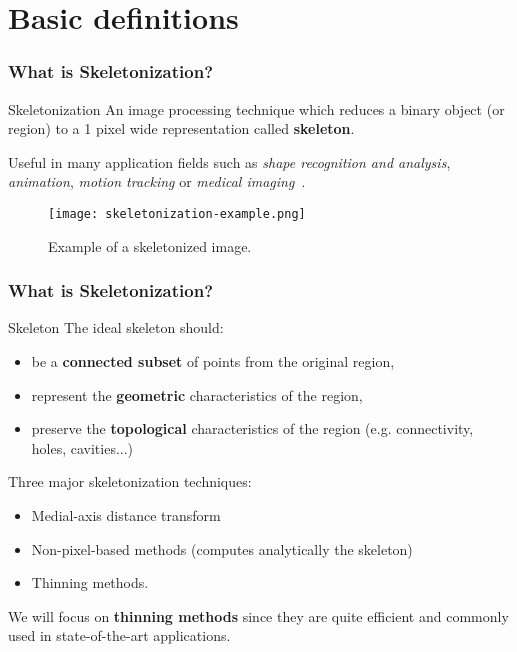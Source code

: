\section{Basic definitions}
\begin{frame}
  \frametitle{What is Skeletonization?}
  \begin{block}{Skeletonization}
    An image processing technique which reduces a binary object (or region) to a 1 pixel wide representation called \textbf{skeleton}.
  \end{block}
  Useful in many application fields such as \emph{shape recognition and analysis}, \emph{animation}, \emph{motion tracking} or \emph{medical imaging}~\cite{skel-applications}.
  \begin{figure}
    \begin{center}
      \texttt{[image: skeletonization-example.png]}
      \caption{Example of a skeletonized image.}
    \end{center}
  \end{figure}
\end{frame}

\begin{frame}
  \label{sli:skeleton}
  \frametitle{What is Skeletonization?}
  \begin{block}{Skeleton}
    The ideal skeleton should:
    \begin{itemize}
      \item be a \textbf{connected subset} of points from the original region,
      \item represent the \textbf{geometric} characteristics of the region,
      \item preserve the \textbf{topological} characteristics of the region (e.g. connectivity, holes, cavities...)
    \end{itemize}
  \end{block}

  Three major skeletonization techniques:
  \begin{itemize}
    \item Medial-axis distance transform
    \item Non-pixel-based methods (computes analytically the skeleton)
    \item Thinning methods.
  \end{itemize}
  \vspace{0.5cm}
  We will focus on \textbf{thinning methods} since they are quite efficient and commonly used in state-of-the-art applications.
\end{frame}